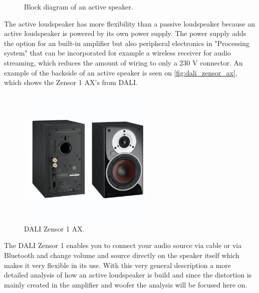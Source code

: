 \begin{figure}[H]
\centering
{}
\scalebox{0.9}{
}
\caption{Block diagram of an active speaker.}
\label{fig:speaker_block}
\end{figure}
The active loudspeaker has more flexibility than a passive loudspeaker because an active loudspeaker is powered by its own power supply. The power supply adds the option for an built-in amplifier but also peripheral electronics in "Processing system" that can be incorporated for example a wireless receiver for audio streaming, which reduces the amount of wiring to only a 230 V connector. An example of the backside of an active speaker is seen on \autoref{fig:dali_zensor_ax}, which shows the Zensor 1 AX's from DALI.
\begin{figure}[H]
\centering
\includegraphics[width=0.6\textwidth]{figures/dali_zensor_1_ax.jpg}
\caption{DALI Zensor 1 AX.}
\label{fig:dali_zensor_ax}
\end{figure}
The DALI Zensor 1 enables you to connect your audio source via cable or via Bluetooth and change volume and source directly on the speaker itself which makes it very flexible in its use. With this very general description a more detailed analysis of how an active loudspeaker is build and since the distortion is mainly created in the amplifier and woofer the analysis will be focused here on.









